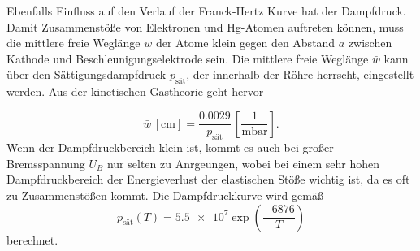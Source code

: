 Ebenfalls Einfluss auf den Verlauf der Franck-Hertz Kurve hat der Dampfdruck. Damit Zusammenstöße von Elektronen und Hg-Atomen 
auftreten können, muss die mittlere freie Weglänge $\bar{w}$ der Atome klein gegen den Abstand $a$ zwischen Kathode und Beschleunigungselektrode
sein. Die mittlere freie Weglänge $\bar{w}$ kann über den Sättigungsdampfdruck $p_{\text{sät}}$, der innerhalb der Röhre herrscht,
eingestellt werden. Aus der kinetischen Gastheorie geht hervor

\begin{equation}
    \bar{w} \, \left[\unit{\centi\meter}\right] = \frac{0.0029}{p_{\text{sät}}} \, \left[ \frac{1}{\unit{\milli\bar}}\right].
    \label{eqn:dampf1}
\end{equation}
Wenn der Dampfdruckbereich klein ist, kommt es auch bei großer Bremsspannung $U_B$ nur selten zu Anrgeungen, wobei bei einem 
sehr hohen Dampfdruckbereich der Energieverlust der elastischen Stöße wichtig ist, da es oft zu Zusammenstößen kommt.
Die Dampfdruckkurve wird gemäß
\begin{equation}
    p_{\text{sät}} (T) = \num{5.5e7} \exp{\left( \frac{-6876}{T} \right)} 
    \label{eqn:dampf2}
\end{equation}
berechnet.
